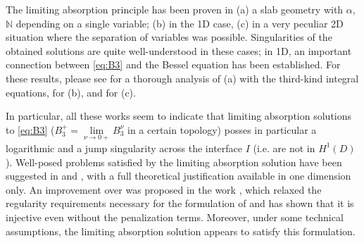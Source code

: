\documentclass[report]{elsarticle}
\numberwithin{theorem}{section}
\begin{document}
The limiting absorption principle has been proven in (a) a slab geometry with $\alpha$, $\mathbb{N}$ depending on a single variable; (b) in the 1D case, (c) in a very peculiar 2D situation where the separation of variables was possible.  Singularities of the obtained solutions are quite well-understood in these cases; in 1D, an important connection between \eqref{eq:B3} and the Bessel equation has been established. For these results, please see  \cite{MR3192426} for a thorough analysis of (a) with the third-kind integral equations,  \cite{MR3611102} for (b), and \cite{phd_thesis_peillon} for (c).

In particular, all these works seem to indicate that limiting absorption solutions to \eqref{eq:B3} ($B_3^+=\lim\limits_{\nu\rightarrow 0+}B^{\nu}_3$ in a certain topology) posses in particular a logarithmic and a jump singularity across the interface $I$ (i.e. are not in $H^1(D)$). 
%	
%	
%	
%	
Well-posed problems satisfied by the limiting absorption solution have been suggested in  \cite{MR3705789} and \cite{nicolopoulos}, with a full theoretical justification available in one dimension only. An improvement over \cite{nicolopoulos} was proposed in the work  \cite{ciarlet_mk_peillon}, which relaxed the regularity requirements necessary for the formulation of \cite{nicolopoulos} and has shown that it is injective even without the penalization terms. Moreover, under some technical assumptions,  the limiting absorption solution appears to satisfy this formulation. 


\end{document}
